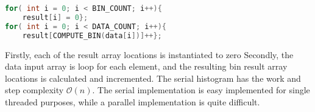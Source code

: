 \begin{lstlisting}[language=C,caption={TBD},label=lst:histogram_serial]
for( int i = 0; i < BIN_COUNT; i++){
	result[i] = 0}; 
for( int i = 0; i < DATA_COUNT; i++){ 
	result[COMPUTE_BIN(data[i])]++}; 
\end{lstlisting}

Firstly, each of the result array locations is instantiated to zero Secondly, the data input array is loop for each element, and the resulting bin result array locations is calculated and incremented. The serial histogram has the work and step complexity $\mathcal{O}(n)$. The serial implementation is easy implemented for single threaded purposes, while a parallel implementation is quite difficult. 

           